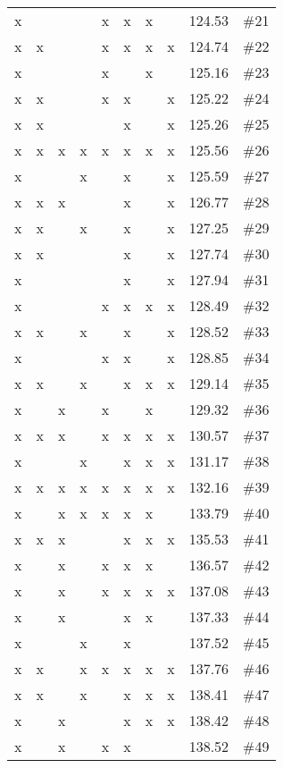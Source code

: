 \begin{table}[H]
{\begin{tabular}{c c c c c c c c c c}
 x &  &  &  &  x &  x &  x &  & 124.53 & \#21 \\
 x &  x &  &  &  x &  x &  x &  x & 124.74 & \#22 \\
 x &  &  &  &  x &  &  x &  & 125.16 & \#23 \\
 x &  x &  &  &  x &  x &  &  x & 125.22 & \#24 \\
 x &  x &  &  &  &  x &  &  x & 125.26 & \#25 \\
 x &  x &  x &  x &  x &  x &  x &  x & 125.56 & \#26 \\
 x &  &  &  x &  &  x &  &  x & 125.59 & \#27 \\
 x &  x &  x &  &  &  x &  &  x & 126.77 & \#28 \\
 x &  x &  &  x &  &  x &  &  x & 127.25 & \#29 \\
 x &  x &  &  &  &  x &  &  x & 127.74 & \#30 \\
 x &  &  &  &  &  x &  &  x & 127.94 & \#31 \\
 x &  &  &  &  x &  x &  x &  x & 128.49 & \#32 \\
 x &  x &  &  x &  &  x &  &  x & 128.52 & \#33 \\
 x &  &  &  &  x &  x &  &  x & 128.85 & \#34 \\
 x &  x &  &  x &  &  x &  x &  x & 129.14 & \#35 \\
 x &  &  x &  &  x &  &  x &  & 129.32 & \#36 \\
 x &  x &  x &  &  x &  x &  x &  x & 130.57 & \#37 \\
 x &  &  &  x &  &  x &  x &  x & 131.17 & \#38 \\
 x &  x &  x &  x &  x &  x &  x &  x & 132.16 & \#39 \\
 x &  &  x &  x &  x &  x &  x &  & 133.79 & \#40 \\
 x &  x &  x &  &  &  x &  x &  x & 135.53 & \#41 \\
 x &  &  x &  &  x &  x &  x &  & 136.57 & \#42 \\
 x &  &  x &  &  x &  x &  x &  x & 137.08 & \#43 \\
 x &  &  x &  &  &  x &  x &  & 137.33 & \#44 \\
 x &  &  &  x &  &  x &  &  & 137.52 & \#45 \\
 x &  x &  &  x &  x &  x &  x &  x & 137.76 & \#46 \\
 x &  x &  &  x &  &  x &  x &  x & 138.41 & \#47 \\
 x &  &  x &  &  &  x &  x &  x & 138.42 & \#48 \\
 x &  &  x &  &  x &  x &  &  & 138.52 & \#49 \\

\end{tabular}}
\end{table}
